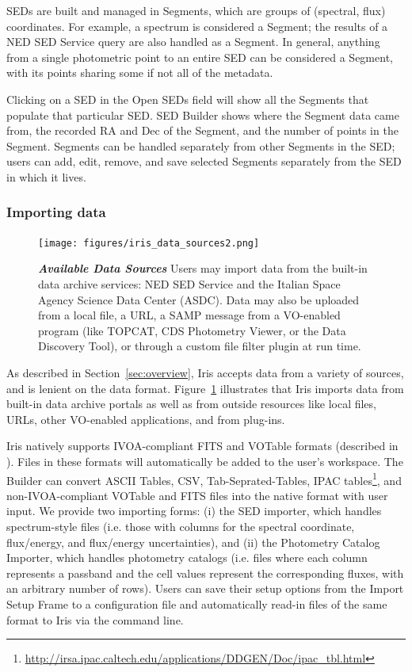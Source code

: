 \documentclass[final,5p]{elsarticle}
\begin{document}
SEDs are built and managed in Segments, which are groups of (spectral, flux) coordinates. For example, a spectrum is considered a Segment; the results of a NED SED Service query are also handled as a Segment. In general, anything from a single photometric point to an entire SED can be considered a Segment, with its points sharing some if not all of the metadata.

Clicking on a SED in the Open SEDs field will show all the Segments that populate that particular SED. SED Builder shows where the Segment data came from, the recorded RA and Dec of the Segment, and the number of points in the Segment. Segments can be handled separately from other Segments in the SED; users can add, edit, remove, and save selected Segments separately from the SED in which it lives.

\subsubsection{Importing data}

\begin{figure}
\begin{center}
\texttt{[image: figures/iris\_data\_sources2.png]}
\caption{\textit{\textbf{\label{fig:data_sources} Available Data Sources}}\textit{}\textbf{}\textit{} Users may import data from the built-in data archive services: NED SED Service and the Italian Space Agency Science Data Center (ASDC). Data may also be uploaded from a local file, a URL, a SAMP message from a VO-enabled program (like TOPCAT, CDS Photometry Viewer, or the Data Discovery Tool), or through a custom file filter plugin at run time.}
\end{center}
\end{figure}

As described in Section~\ref{sec:overview}, Iris accepts data from a variety of sources, and is lenient on the data format. Figure~\ref{fig:data_sources} illustrates that Iris imports data from built-in data archive portals as well as from outside resources like local files, URLs, other VO-enabled applications, and from plug-ins.

Iris natively supports IVOA-compliant FITS and VOTable formats (described in \citet{2012arXiv1204.3055M}). Files in these formats will automatically be added to the user's workspace. The Builder can convert ASCII Tables, CSV, Tab-Seprated-Tables, IPAC tables\footnote{\url{http://irsa.ipac.caltech.edu/applications/DDGEN/Doc/ipac\_tbl.html}}, and non-IVOA-compliant VOTable and FITS files into the native format with user input. We provide two importing forms: (i) the SED importer, which handles spectrum-style files (i.e. those with columns for the spectral coordinate, flux/energy, and flux/energy uncertainties), and (ii) the Photometry Catalog Importer, which handles photometry catalogs (i.e. files where each column represents a passband and the cell values represent the corresponding fluxes, with an arbitrary number of rows). Users can save their setup options from the Import Setup Frame to a configuration file and automatically read-in files of the same format to Iris via the command line.
\end{document}
